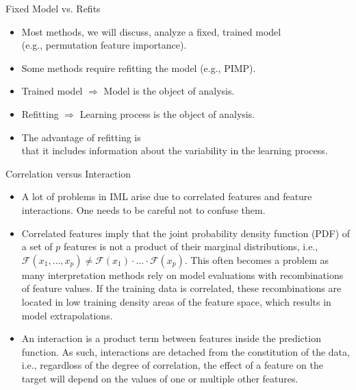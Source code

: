 \documentclass[11pt,compress,t,notes=noshow, xcolor=table]{beamer}
\begin{document}
\begin{vbframe}{Fixed Model vs. Refits}
	\begin{itemize}
		\itemsep1em
		\item Most methods, we will discuss, analyze a fixed, trained model\\ 
		(e.g., permutation feature importance).
		\item Some methods require refitting the model (e.g., PIMP).
		\item Trained model $\Rightarrow$ Model is the object of analysis.
		\item Refitting $\Rightarrow$ Learning process is the object of analysis.
		\item The advantage of refitting is\\ that it includes information about the variability in the learning process.
	\end{itemize}
\end{vbframe}



\begin{vbframe}{Correlation versus Interaction}
\begin{itemize}
\item A lot of problems in IML arise due to correlated features and feature interactions. One needs to be careful not to confuse them.
\item Correlated features imply that the joint probability density function (PDF) of a set of $p$ features is not a product of their marginal distributions, i.e., $\mathcal{F}(x_1, \dots, x_p) \neq \mathcal{F}(x_1) \cdot \ldots \cdot \mathcal{F}(x_p)$. This often becomes a problem as many interpretation methods rely on model evaluations with recombinations of feature values. If the training data is correlated, these recombinations are located in low training density areas of the feature space, which results in model extrapolations.
\item An interaction is a product term between features inside the prediction function. As such, interactions are detached from the constitution of the data, i.e., regardloss of the degree of correlation, the effect of a feature on the target will depend on the values of one or multiple other features.
\end{itemize}
\end{vbframe}
\end{document}
